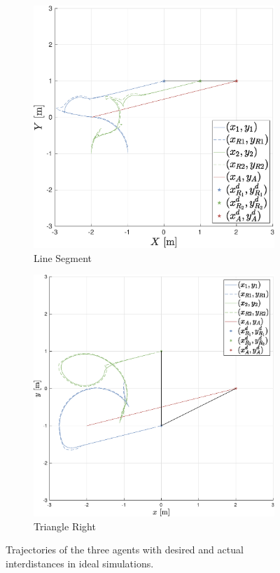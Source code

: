 \documentclass{ifacconf}
\begin{document}
\begin{figure}[b]
\begin{subfigure}[b]{0.32\columnwidth}
        \includegraphics[width=\linewidth]{images/simulations/with_APF/not_noisy/2nd_scenario_with_noNoise.eps}
        \caption{Line Segment}
         \label{fig:sim_withAPF_noNoise_2}
    \end{subfigure}
    \begin{subfigure}[b]{0.32\columnwidth}
        \centering
        \includegraphics[width=\linewidth]{images/simulations/with_APF/not_noisy/3rd_scenario_with_noNoise.eps}
      \caption{Triangle Right}
         \label{fig:sim_withAPF_noNoise_3}
    \end{subfigure}
    \vspace{-0.2cm}
    \caption{Trajectories of the three agents with desired and actual interdistances in ideal simulations.}
    \label{fig:sim_withAPF_noNoise}
\end{figure}
\end{document}
